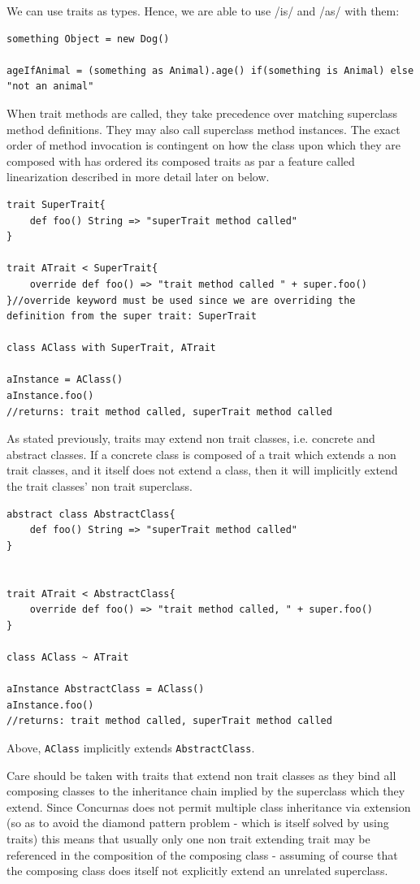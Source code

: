 \documentclass[conc-doc]{subfiles}
\begin{document}
We can use traits as types. Hence, we are able to use /is/ and /as/ with them:
\begin{lstlisting}
something Object = new Dog()

ageIfAnimal = (something as Animal).age() if(something is Animal) else "not an animal"
\end{lstlisting}

When trait methods are called, they take precedence over matching superclass method definitions. They may also call superclass method instances. The exact order of method invocation is contingent on how the class upon which they are composed with has ordered its composed traits as par a feature called linearization described in more detail later on below.

\begin{lstlisting}
trait SuperTrait{
	def foo() String => "superTrait method called"
}

trait ATrait < SuperTrait{
	override def foo() => "trait method called " + super.foo()
}//override keyword must be used since we are overriding the definition from the super trait: SuperTrait

class AClass with SuperTrait, ATrait

aInstance = AClass() 
aInstance.foo()
//returns: trait method called, superTrait method called
\end{lstlisting}

As stated previously, traits may extend non trait classes, i.e. concrete and abstract classes. If a concrete class is composed of a trait which extends a non trait classes, and it itself does not extend a class, then it will implicitly extend the trait classes' non trait superclass.

\begin{lstlisting}
abstract class AbstractClass{
	def foo() String => "superTrait method called"
}


trait ATrait < AbstractClass{
	override def foo() => "trait method called, " + super.foo()
}

class AClass ~ ATrait 

aInstance AbstractClass = AClass() 
aInstance.foo()
//returns: trait method called, superTrait method called
\end{lstlisting}

Above, \lstinline{AClass} implicitly extends \lstinline{AbstractClass}. 

Care should be taken with traits that extend non trait classes as they bind all composing classes to the inheritance chain implied by the superclass which they extend. Since Concurnas does not permit multiple class inheritance via extension (so as to avoid the diamond pattern problem - which is itself solved by using traits) this means that usually only one non trait extending trait may be referenced in the composition of the composing class - assuming of course that the composing class does itself not explicitly extend an unrelated superclass.
\end{document}
